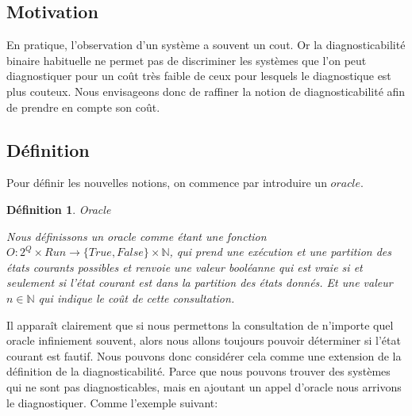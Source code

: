\documentclass[a4paper,10pt]{article}
\newtheorem{mydef}{D\'efinition}
\begin{document}
\subsection{Motivation}

En pratique, l'observation d'un système a souvent un cout. Or la diagnosticabilité binaire habituelle ne permet pas de discriminer les systèmes que l'on peut diagnostiquer pour un coût très faible de ceux pour lesquels le diagnostique est plus couteux. Nous envisageons donc de raffiner la notion de diagnosticabilit\'e afin de prendre en compte son coût.


\subsection{D\'efinition}

Pour d\'efinir les nouvelles notions, on commence par introduire un $oracle$.

\begin{mydef}{Oracle}

  Nous d\'efinissons un oracle comme \'etant une fonction $O: 2^Q\times Run \to \{True, False\} \times \mathbb{N}$, qui prend une ex\'ecution et une partition des \'etats courants possibles et renvoie une valeur bool\'eanne qui est vraie si et seulement si l'\'etat courant est dans la partition des \'etats donn\'es. Et une valeur $n \in \mathbb{N}$ qui indique le co\^ut de cette consultation.

\end{mydef}

Il apparaît clairement que si nous permettons la consultation de n'importe quel oracle infiniement souvent, alors nous allons toujours pouvoir d\'eterminer si l'\'etat courant est fautif. Nous pouvons donc consid\'erer cela comme une extension de la d\'efinition de la diagnosticabilit\'e. Parce que nous pouvons trouver des syst\`emes qui ne sont pas diagnosticables, mais en ajoutant un appel d'oracle nous arrivons le diagnostiquer. Comme l'exemple suivant:

\begin{figure}[H]
  \begin{center}
  \end{center}
\end{figure}
\end{document}
